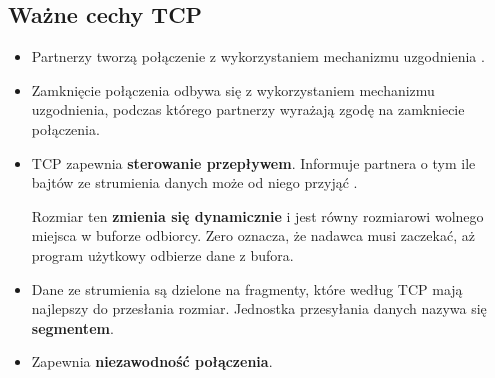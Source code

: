 \documentclass[../sk-egzamin.tex]{subfiles}
\begin{document}

\subsection*{Ważne cechy TCP}
\begin{itemize}
    \item Partnerzy  tworzą połączenie
    z wykorzystaniem mechanizmu uzgodnienia .

    \item Zamknięcie połączenia odbywa się z wykorzystaniem mechanizmu
    uzgodnienia, podczas którego partnerzy wyrażają zgodę na zamkniecie
    połączenia.

    \item TCP zapewnia \textbf{sterowanie przepływem}.
    Informuje partnera o tym ile bajtów ze strumienia danych może od niego
    przyjąć .

    Rozmiar ten \textbf{zmienia się dynamicznie} i
    jest równy rozmiarowi wolnego miejsca w buforze odbiorcy.
    Zero oznacza, że nadawca musi zaczekać, aż program użytkowy odbierze dane
    z bufora.

    \item Dane ze strumienia są dzielone na fragmenty, które według TCP mają
    najlepszy do przesłania rozmiar.
    Jednostka przesyłania danych nazywa się \textbf{segmentem}.

    \item Zapewnia \textbf{niezawodność połączenia}.
\end{itemize}

\pagebreak
\end{document}
